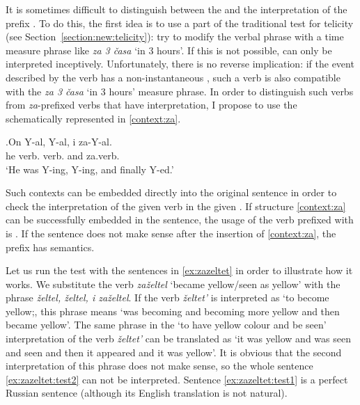 It is sometimes difficult to distinguish between the  and the  interpretation of the prefix . To do this, the first idea is to use a part of the traditional test for telicity (see Section~\ref{section:new:telicity}): try to modify the verbal phrase with a time measure phrase like \textit{za 3 \v{c}asa} `in 3 hours'. If this is not possible, can only be interpreted inceptively. Unfortunately, there is no reverse implication: if the event described by the  verb has a non-instantaneous , such a verb is also compatible with the \textit{za 3 \v{c}asa} `in 3 hours' measure phrase. In order to distinguish such verbs from \textit{za}-prefixed verbs that have  interpretation, I propose to use the  schematically represented in \ref{context:za}.

\exg.\label{context:za}On Y-al, Y-al, i za-Y-al.\\
he verb. verb. and za.verb.\\
\trans `He was Y-ing, Y-ing, and finally Y-ed.'

Such contexts can be embedded directly into the original sentence in order to check the interpretation of the given verb in the given . If structure \ref{context:za} can be successfully embedded in the sentence, the usage of the verb prefixed with  is . If the sentence does not make sense after the insertion of  \ref{context:za}, the prefix  has  semantics.

Let us run the test with the sentences in \ref{ex:zazeltet} in order to illustrate how it works. We substitute the verb \textit{za\v{z}eltel} `became yellow/seen as yellow' with the phrase \textit{\v{z}eltel, \v{z}eltel, i za\v{z}eltel}. If the verb \textit{\v{z}eltet'} is interpreted as `to become yellow;, this phrase means `was becoming and becoming more yellow and then became yellow'. The same phrase in the `to have yellow colour and be seen' interpretation of the verb \textit{\v{z}eltet'} can be translated as `it was yellow and was seen and seen and then it appeared and it was yellow'. It is obvious that the second interpretation of this phrase does not make sense, so the whole sentence \ref{ex:zazeltet:test2} can not be interpreted. Sentence \ref{ex:zazeltet:test1} is a perfect Russian sentence (although its English translation is not natural).

